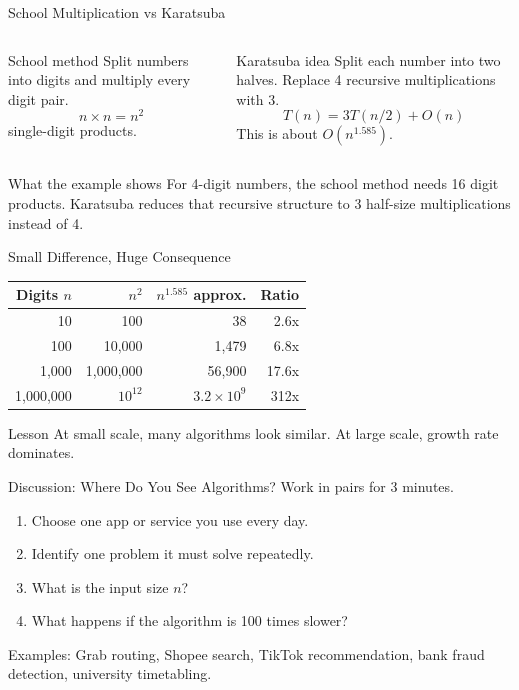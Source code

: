 \documentclass[aspectratio=169,xcolor=dvipsnames]{beamer}
\begin{document}
\begin{frame}{School Multiplication vs Karatsuba}
  \begin{columns}
    \begin{block}{School method}
      Split numbers into digits and multiply every digit pair.
      \[
        n \times n = n^2
      \]
      single-digit products.
    \end{block}
    \begin{exampleblock}{Karatsuba idea}
      Split each number into two halves. Replace 4 recursive multiplications with 3.
      \[
        T(n) = 3T(n/2) + O(n)
      \]
      This is about $O(n^{1.585})$.
    \end{exampleblock}
  \end{columns}
  \vspace{0.7em}
  \begin{block}{What the example shows}
    For 4-digit numbers, the school method needs 16 digit products. Karatsuba reduces that recursive structure to 3 half-size multiplications instead of 4.
  \end{block}
\end{frame}

\begin{frame}{Small Difference, Huge Consequence}
  \begin{table}
    \centering
    \begin{tabular}{rrrr}
      \toprule
      Digits $n$ & $n^2$ & $n^{1.585}$ approx. & Ratio \\
      \midrule
      10 & 100 & 38 & 2.6x \\
      100 & 10,000 & 1,479 & 6.8x \\
      1,000 & 1,000,000 & 56,900 & 17.6x \\
      1,000,000 & $10^{12}$ & $3.2\times 10^9$ & 312x \\
      \bottomrule
    \end{tabular}
  \end{table}
  \vspace{0.4em}
  \begin{alertblock}{Lesson}
    At small scale, many algorithms look similar. At large scale, growth rate dominates.
  \end{alertblock}
\end{frame}

\begin{frame}{Discussion: Where Do You See Algorithms?}
  Work in pairs for 3 minutes.
  \begin{enumerate}
    \item Choose one app or service you use every day.
    \item Identify one problem it must solve repeatedly.
    \item What is the input size $n$?
    \item What happens if the algorithm is 100 times slower?
  \end{enumerate}
  \vspace{0.7em}
  Examples: Grab routing, Shopee search, TikTok recommendation, bank fraud detection, university timetabling.
\end{frame}
\end{document}
